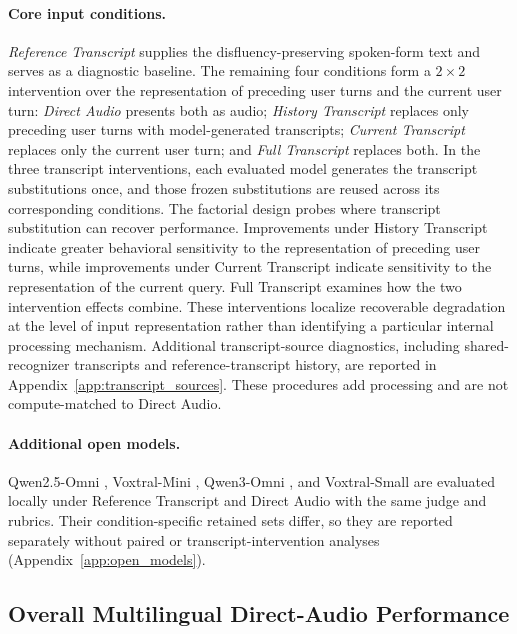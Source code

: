 \documentclass{article}
\begin{document}
\paragraph{Core input conditions.}
\textit{Reference Transcript} supplies the disfluency-preserving spoken-form text and serves as a diagnostic baseline. The remaining four conditions form a $2\times2$ intervention over the representation of preceding user turns and the current user turn: \textit{Direct Audio} presents both as audio; \textit{History Transcript} replaces only preceding user turns with model-generated transcripts; \textit{Current Transcript} replaces only the current user turn; and \textit{Full Transcript} replaces both. In the three transcript interventions, each evaluated model generates the transcript substitutions once, and those frozen substitutions are reused across its corresponding conditions. The factorial design probes where transcript substitution can recover performance. Improvements under History Transcript indicate greater behavioral sensitivity to the representation of preceding user turns, while improvements under Current Transcript indicate sensitivity to the representation of the current query. Full Transcript examines how the two intervention effects combine. These interventions localize recoverable degradation at the level of input representation rather than identifying a particular internal processing mechanism. Additional transcript-source diagnostics, including shared-recognizer transcripts and reference-transcript history, are reported in Appendix~\ref{app:transcript_sources}. These procedures add processing and are not compute-matched to Direct Audio.

\paragraph{Additional open models.}
Qwen2.5-Omni \citep{xu2025qwen25omni}, Voxtral-Mini \citep{mistral2025voxtral}, Qwen3-Omni \citep{xu2025qwen3omni}, and Voxtral-Small are evaluated locally under Reference Transcript and Direct Audio with the same judge and rubrics. Their condition-specific retained sets differ, so they are reported separately without paired or transcript-intervention analyses (Appendix~\ref{app:open_models}).

\subsection{Overall Multilingual Direct-Audio Performance}
\label{sec:overall_evaluation}
\end{document}
